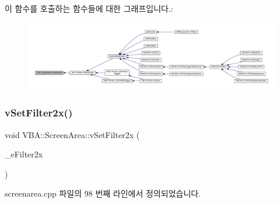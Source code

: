 이 함수를 호출하는 함수들에 대한 그래프입니다.\+:
\nopagebreak
\begin{figure}[H]
\begin{center}
\leavevmode
\includegraphics[width=350pt]{class_v_b_a_1_1_screen_area_ad7b6579afb665abf3b6a5004f03b63f8_icgraph}
\end{center}
\end{figure}
\mbox{\label{class_v_b_a_1_1_screen_area_ad42090409e7ddec2c1cd9d715a38f8d9}} 
\subsubsection{\texorpdfstring{v\+Set\+Filter2x()}{vSetFilter2x()}}
{\footnotesize\ttfamily void V\+B\+A\+::\+Screen\+Area\+::v\+Set\+Filter2x (\begin{DoxyParamCaption}\item[{\mbox{\hyperlink{class_v_b_a_a1683020d7324daf3bda627d0d3658e3e}{E\+Filter2x}}}]{\+\_\+e\+Filter2x }\end{DoxyParamCaption})}



screenarea.\+cpp 파일의 98 번째 라인에서 정의되었습니다.


